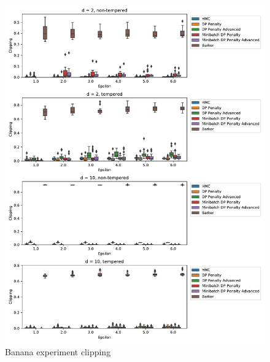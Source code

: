 ﻿\documentclass[a4paper]{article}
\begin{document}
\begin{figure}[h]
  \centering
  \includegraphics[width=\textwidth]{figures/banana_clipping}
  \caption{Banana experiment clipping}
  \label{banana_clipping_fig}
\end{figure}
\end{document}
